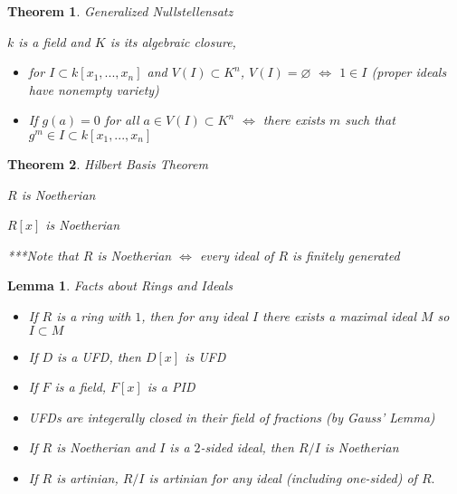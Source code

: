 \documentclass[12pt]{Qual}
\newtheorem{theorem}{Theorem}
\newtheorem{lemma}{Lemma}
\begin{document}
\vspace{0.5cm}
\begin{theorem}{\Large\textit{Generalized Nullstellensatz}}

 $k$ is a field and $K$ is its algebraic closure,

\begin{itemize}[leftmargin=3cm]
\renewcommand\labelitemi{\faPuzzlePiece}
    \item  for $I\subset k[x_1,...,x_n]$ and $V(I)\subset K^n$, $V(I)=\varnothing$ $\iff$ $1\in I$ (proper ideals have nonempty variety)
    \item If $g(a)=0$ for all $a\in V(I)\subset K^n$ $\iff$ there exists $m$ such that $g^m\in I\subset k[x_1,...,x_n]$
\end{itemize}

\end{theorem}
\vspace{0.5cm}
\begin{theorem}{\Large\textit{Hilbert Basis Theorem}}

 $R$ is Noetherian

 $R[x]$ is Noetherian

\begin{mybox}
***Note that $R$ is Noetherian $\iff$ every ideal of $R$ is finitely generated
\end{mybox}

\end{theorem}
\vspace{0.5cm}
\begin{lemma}{\Large\textit{Facts about Rings and Ideals}}

\begin{itemize}
\renewcommand\labelitemi{\faCoffee}
    \item If $R$ is a ring with $1$, then for any ideal $I$ there exists a maximal ideal $M$ so $I\subset M$
    \item If $D$ is a UFD, then $D[x]$ is UFD
    \item If $F$ is a field, $F[x]$ is a PID
    \item UFDs are integerally closed in their field of fractions (by Gauss' Lemma)
    \item If $R$ is Noetherian and $I$ is a $2$-sided ideal, then $R/I$ is Noetherian
    \item If $R$ is artinian, $R/I$ is artinian for any ideal (including one-sided) of $R.$
\end{itemize}

\end{lemma}
\end{document}

